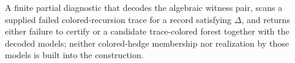 A finite partial diagnostic that decodes the algebraic witness pair, scans a supplied failed colored-recursion trace for a record satisfying \(\Delta\), and returns either failure to certify or a candidate trace-colored forest together with the decoded models; neither colored-hedge membership nor realization by those models is built into the construction.